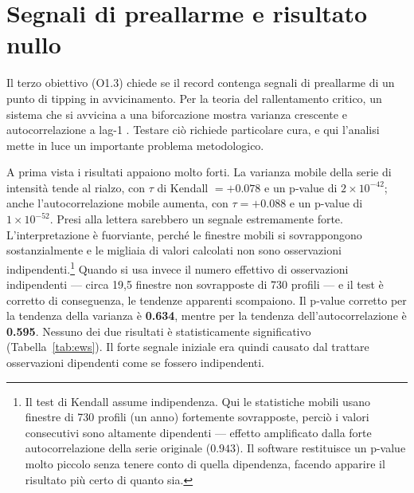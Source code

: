 \section{Segnali di preallarme e risultato nullo}
\label{sec:detect-ews}

Il terzo obiettivo (O1.3) chiede se il record contenga segnali di preallarme di un punto di tipping in avvicinamento. Per la teoria del rallentamento critico, un sistema che si avvicina a una biforcazione mostra varianza crescente e autocorrelazione a lag-1 \citep{dakos2012, scheffer2009}. Testare ciò richiede particolare cura, e qui l'analisi mette in luce un importante problema metodologico.

A prima vista i risultati appaiono molto forti. La varianza mobile della serie di intensità tende al rialzo, con $\tau$ di Kendall $= +0.078$ e un p-value di $2\times10^{-42}$; anche l'autocorrelazione mobile aumenta, con $\tau = +0.088$ e un p-value di $1\times10^{-52}$. Presi alla lettera sarebbero un segnale estremamente forte. L'interpretazione è fuorviante, perché le finestre mobili si sovrappongono sostanzialmente e le migliaia di valori calcolati non sono osservazioni indipendenti.\footnote{Il test di Kendall assume indipendenza. Qui le statistiche mobili usano finestre di 730 profili (un anno) fortemente sovrapposte, perciò i valori consecutivi sono altamente dipendenti --- effetto amplificato dalla forte autocorrelazione della serie originale ($0.943$). Il software restituisce un p-value molto piccolo senza tenere conto di quella dipendenza, facendo apparire il risultato più certo di quanto sia.} Quando si usa invece il numero effettivo di osservazioni indipendenti --- circa 19,5 finestre non sovrapposte di 730 profili --- e il test è corretto di conseguenza, le tendenze apparenti scompaiono. Il p-value corretto per la tendenza della varianza è \textbf{0.634}, mentre per la tendenza dell'autocorrelazione è \textbf{0.595}. Nessuno dei due risultati è statisticamente significativo (Tabella~\ref{tab:ews}). Il forte segnale iniziale era quindi causato dal trattare osservazioni dipendenti come se fossero indipendenti.





